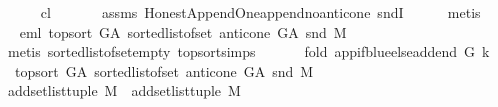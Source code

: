 \begin{isabellebody}
\ \ \ \ \isamarkupfalse%
\ c{\isacharunderscore}{\kern0pt}l\ \isanewline
\ \ \ \ \isamarkupfalse%
\ assms\ Honest{\isacharunderscore}{\kern0pt}Append{\isacharunderscore}{\kern0pt}One{\isachardot}{\kern0pt}append{\isacharunderscore}{\kern0pt}no{\isacharunderscore}{\kern0pt}anticone\ sndI\isanewline
\ \ \ \ \isamarkupfalse%
\ metis\isanewline
\ \ \isamarkupfalse%
\ \isamarkupfalse%
\ eml{\isacharcolon}{\kern0pt}\ {\isachardoublequoteopen}{\isacharparenleft}{\kern0pt}top{\isacharunderscore}{\kern0pt}sort\ G{\isacharunderscore}{\kern0pt}A\ {\isacharparenleft}{\kern0pt}sorted{\isacharunderscore}{\kern0pt}list{\isacharunderscore}{\kern0pt}of{\isacharunderscore}{\kern0pt}set\ {\isacharparenleft}{\kern0pt}anticone\ G{\isacharunderscore}{\kern0pt}A\ {\isacharparenleft}{\kern0pt}snd\ {\isacharquery}{\kern0pt}M{\isacharparenright}{\kern0pt}{\isacharparenright}{\kern0pt}{\isacharparenright}{\kern0pt}{\isacharparenright}{\kern0pt}\ {\isacharequal}{\kern0pt}\ {\isacharbrackleft}{\kern0pt}{\isacharbrackright}{\kern0pt}{\isachardoublequoteclose}\isanewline
\ \ \ \ \isamarkupfalse%
\ {\isacharparenleft}{\kern0pt}metis\ sorted{\isacharunderscore}{\kern0pt}list{\isacharunderscore}{\kern0pt}of{\isacharunderscore}{\kern0pt}set{\isacharunderscore}{\kern0pt}empty\ top{\isacharunderscore}{\kern0pt}sort{\isachardot}{\kern0pt}simps{\isacharparenleft}{\kern0pt}{}{\isacharparenright}{\kern0pt}{\isacharparenright}{\kern0pt}\ \isanewline
\ \ \isamarkupfalse%
\ \isamarkupfalse%
\ {\isachardoublequoteopen}{\isacharparenleft}{\kern0pt}fold\ {\isacharparenleft}{\kern0pt}app{\isacharunderscore}{\kern0pt}if{\isacharunderscore}{\kern0pt}blue{\isacharunderscore}{\kern0pt}else{\isacharunderscore}{\kern0pt}add{\isacharunderscore}{\kern0pt}end\ G\ k{\isacharparenright}{\kern0pt}\ \isanewline
\ \ {\isacharparenleft}{\kern0pt}top{\isacharunderscore}{\kern0pt}sort\ G{\isacharunderscore}{\kern0pt}A\ {\isacharparenleft}{\kern0pt}sorted{\isacharunderscore}{\kern0pt}list{\isacharunderscore}{\kern0pt}of{\isacharunderscore}{\kern0pt}set\ {\isacharparenleft}{\kern0pt}anticone\ G{\isacharunderscore}{\kern0pt}A\ {\isacharparenleft}{\kern0pt}snd\ {\isacharquery}{\kern0pt}M{\isacharparenright}{\kern0pt}{\isacharparenright}{\kern0pt}{\isacharparenright}{\kern0pt}{\isacharparenright}{\kern0pt}\isanewline
\ {\isacharparenleft}{\kern0pt}add{\isacharunderscore}{\kern0pt}set{\isacharunderscore}{\kern0pt}list{\isacharunderscore}{\kern0pt}tuple\ {\isacharquery}{\kern0pt}M{\isacharparenright}{\kern0pt}{\isacharparenright}{\kern0pt}\ {\isacharequal}{\kern0pt}\ {\isacharparenleft}{\kern0pt}add{\isacharunderscore}{\kern0pt}set{\isacharunderscore}{\kern0pt}list{\isacharunderscore}{\kern0pt}tuple\ {\isacharquery}{\kern0pt}M{\isacharparenright}{\kern0pt}{\isachardoublequoteclose}\ \ \isanewline

\end{isabellebody}
